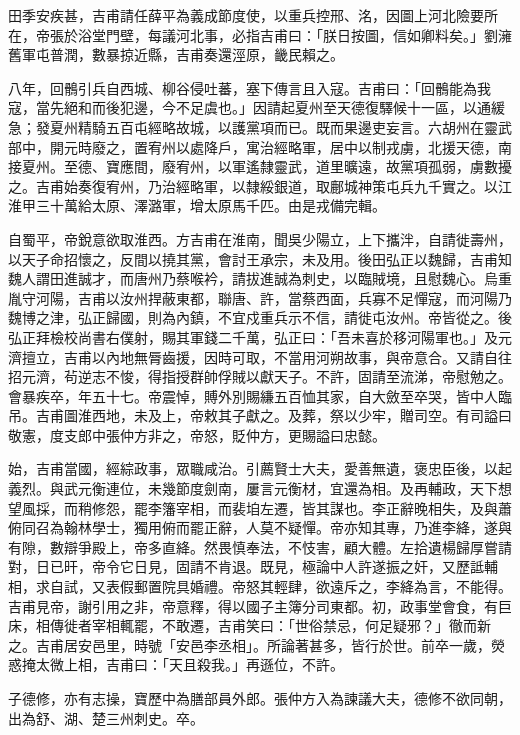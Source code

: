 \begin{pinyinscope}
 田季安疾甚，吉甫請任薛平為義成節度使，以重兵控邢、洺，因圖上河北險要所在，帝張於浴堂門壁，每議河北事，必指吉甫曰：「朕日按圖，信如卿料矣。」劉澭舊軍屯普潤，數暴掠近縣，吉甫奏還涇原，畿民賴之。



 八年，回鶻引兵自西城、柳谷侵吐蕃，塞下傳言且入寇。吉甫曰：「回鶻能為我寇，當先絕和而後犯邊，今不足虞也。」因請起夏州至天德復驛候十一區，以通緩急；發夏州精騎五百屯經略故城，以護黨項而已。既而果邊吏妄言。六胡州在靈武部中，開元時廢之，置宥州以處降戶，寓治經略軍，居中以制戎虜，北援天德，南接夏州。至德、寶應間，廢宥州，以軍遙隸靈武，道里曠遠，故黨項孤弱，虜數擾之。吉甫始奏復宥州，乃治經略軍，以隸綏銀道，取鄜城神策屯兵九千實之。以江淮甲三十萬給太原、澤潞軍，增太原馬千匹。由是戎備完輯。



 自蜀平，帝銳意欲取淮西。方吉甫在淮南，聞吳少陽立，上下攜泮，自請徙壽州，以天子命招懷之，反間以撓其黨，會討王承宗，未及用。後田弘正以魏歸，吉甫知魏人謂田進誠才，而唐州乃蔡喉衿，請拔進誠為刺史，以臨賊境，且慰魏心。烏重胤守河陽，吉甫以汝州捍蔽東都，聯唐、許，當蔡西面，兵寡不足憚寇，而河陽乃魏博之津，弘正歸國，則為內鎮，不宜戍重兵示不信，請徙屯汝州。帝皆從之。後弘正拜檢校尚書右僕射，賜其軍錢二千萬，弘正曰：「吾未喜於移河陽軍也。」及元濟擅立，吉甫以內地無脣齒援，因時可取，不當用河朔故事，與帝意合。又請自往招元濟，茍逆志不悛，得指授群帥俘賊以獻天子。不許，固請至流涕，帝慰勉之。會暴疾卒，年五十七。帝震悼，賻外別賜縑五百恤其家，自大斂至卒哭，皆中人臨吊。吉甫圖淮西地，未及上，帝敕其子獻之。及葬，祭以少牢，贈司空。有司謚曰敬憲，度支郎中張仲方非之，帝怒，貶仲方，更賜謚曰忠懿。



 始，吉甫當國，經綜政事，眾職咸治。引薦賢士大夫，愛善無遺，褒忠臣後，以起義烈。與武元衡連位，未幾節度劍南，屢言元衡材，宜還為相。及再輔政，天下想望風採，而稍修怨，罷李籓宰相，而裴垍左遷，皆其謀也。李正辭晚相失，及與蕭俯同召為翰林學士，獨用俯而罷正辭，人莫不疑憚。帝亦知其專，乃進李絳，遂與有隙，數辯爭殿上，帝多直絳。然畏慎奉法，不忮害，顧大體。左拾遺楊歸厚嘗請對，日已旰，帝令它日見，固請不肯退。既見，極論中人許遂振之奸，又歷詆輔相，求自試，又表假郵置院具婚禮。帝怒其輕肆，欲遠斥之，李絳為言，不能得。吉甫見帝，謝引用之非，帝意釋，得以國子主簿分司東都。初，政事堂會食，有巨床，相傳徙者宰相輒罷，不敢遷，吉甫笑曰：「世俗禁忌，何足疑邪？」徹而新之。吉甫居安邑里，時號「安邑李丞相」。所論著甚多，皆行於世。前卒一歲，熒惑掩太微上相，吉甫曰：「天且殺我。」再遜位，不許。



 子德修，亦有志操，寶歷中為膳部員外郎。張仲方入為諫議大夫，德修不欲同朝，出為舒、湖、楚三州刺史。卒。




\end{pinyinscope}
